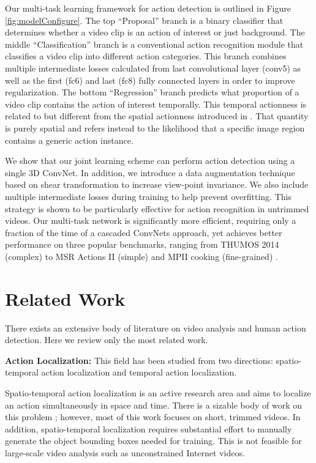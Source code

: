\documentclass[10pt,twocolumn,letterpaper]{article}
\begin{document}
Our multi-task learning framework for action detection is outlined in Figure \ref{fig:modelConfigure}. 
The top ``Proposal'' branch is a binary classifier that determines whether a video clip is an action of interest or just background. 
The middle ``Classification'' branch is a conventional action recognition module that classifies a video clip into different action categories. 
This branch combines multiple intermediate losses calculated from last convolutional layer (\textsf{conv5}) as well as the first (\textsf{fc6}) and last (\textsf{fc8}) fully connected layers in order to improve regularization.
The bottom ``Regression'' branch predicts what proportion of a video clip contains the action of interest temporally. This temporal actionness is related to but different from the spatial actionness introduced in \cite{actionness_cvpr14_chen}. That quantity is purely spatial and refers instead to the likelihood that a specific image region contains a generic action instance. 

We show that our joint learning scheme can perform action detection using a single 3D ConvNet. 
In addition, we introduce a data augmentation technique based on shear transformation to increase view-point invariance. 
We also include multiple intermediate losses during training to help prevent overfitting. This strategy is shown to be particularly effective for action recognition in untrimmed videos. Our multi-task network is significantly more efficient, requiring only a fraction of the time of a cascaded ConvNets approach, yet achieves better performance on three popular benchmarks, ranging from THUMOS 2014 (complex) \cite{THUMOS14} to MSR Actions II (simple) \cite{MSR_action_II_PAMI11} and MPII cooking (fine-grained) \cite{MPII_cooking_cvpr12}.

\section{Related Work}
\label{sec:related}
There exists an extensive body of literature on video analysis and human action detection. Here we review only the most related work.

\noindent \textbf{Action Localization:} This field has been studied from two directions: spatio-temporal action localization and temporal action localization. 

Spatio-temporal action localization is an active research area and aims to localize an action simultaneously in space and time. There is a sizable body of work on this problem \cite{DAP3D2016,15000object2015,Objects2action_Jain_iccv15,actionLocal_context_Soomro_iccv15,actionLocal_track_Weinzaepfel_iccv15,action_tubes_cvpr15_Gkioxari,joint_lan_iccv11}; however, most of this work focuses on short, trimmed videos. In addition, spatio-temporal localization requires substantial effort to manually generate the object bounding boxes needed for training. This is not feasible for large-scale video analysis such as unconstrained Internet videos.
\end{document}

